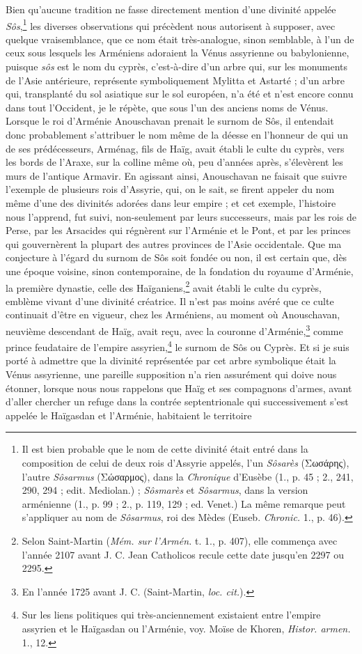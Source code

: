 \documentclass{article}
\begin{document}
Bien qu'aucune tradition ne fasse directement mention d'une divinité appelée \emph{Sôs},\footnote{Il est bien probable que le nom de cette divinité était entré dans la composition de celui de deux rois d'Assyrie appelés, l'un \emph{Sôsarès} (\textgreek{Σωσάρης}), l'autre \emph{Sôsarmus} (\textgreek{Σώσαρμος}), dans la \emph{Chronique} d'Eusèbe (1., p. 45 ; 2., 241, 290, 294 ; edit. Mediolan.) ; \emph{Sôsmarès} et \emph{Sôsarmus}, dans la version arménienne (1., p. 99 ; 2., p. 119, 129 ; ed. Venet.) La même remarque peut s'appliquer au nom de \emph{Sôsarmus}, roi des Mèdes (Euseb. \emph{Chronic.} 1., p. 46).} les diverses observations qui précèdent nous autorisent à supposer, avec quelque vraisemblance, que ce nom était très-analogue, sinon semblable, à l'un de ceux sous lesquels les Arméniens adoraient la Vénus assyrienne ou babylonienne, puisque \emph{sôs} est le nom du cyprès, c'est-à-dire d'un arbre qui, sur les monuments de l'Asie antérieure, représente symboliquement Mylitta et Astarté ; d'un arbre qui, transplanté du sol asiatique sur le sol européen, n'a été et n'est encore connu dans tout l'Occident, je le répète, que sous l'un des anciens noms de Vénus. Lorsque le roi d'Arménie Anouschavan prenait le surnom de Sôs, il entendait donc probablement s'attribuer le nom même de la déesse en l'honneur de qui un de ses prédécesseurs, Arménag, fils de Haïg, avait établi le culte du cyprès, vers les bords de l'Araxe, sur la colline même où, peu d'années après, s'élevèrent les murs de l'antique Armavir. En agissant ainsi, Anouschavan ne faisait que suivre l'exemple de plusieurs rois d'Assyrie, qui, on le sait, se firent appeler du nom même d'une des divinités adorées dans leur empire ; et cet exemple, l'histoire nous l'apprend, fut suivi, non-seulement par leurs successeurs, mais par les rois de Perse, par les Arsacides qui régnèrent sur l'Arménie et le Pont, et par les princes qui gouvernèrent la plupart des autres provinces de l'Asie occidentale. Que ma conjecture à l'égard du surnom de Sôs soit fondée ou non, il est certain que, dès une époque voisine, sinon contemporaine, de la fondation du royaume d'Arménie, la première dynastie, celle des Haïganiens,\footnote{Selon Saint-Martin (\emph{Mém. sur l'Armén.} t. 1., p. 407), elle commença avec l'année 2107 avant J. C. Jean Catholicos recule cette date jusqu'en 2297 ou 2295.} avait établi le culte du cyprès, emblème vivant d'une divinité créatrice. Il n'est pas moins avéré que ce culte continuait d'être en vigueur, chez les Arméniens, au moment où Anouschavan, neuvième descendant de Haïg, avait reçu, avec la couronne d'Arménie,\footnote{En l'année 1725 avant J. C. (Saint-Martin, \emph{loc. cit.}).} comme prince feudataire de l'empire assyrien,\footnote{Sur les liens politiques qui très-anciennement existaient entre l'empire assyrien et le Haïgasdan ou l'Arménie, voy. Moïse de Khoren, \emph{Histor. armen.} 1., 12.} le surnom de Sôs ou Cyprès. Et si je suis porté à admettre que la divinité représentée par cet arbre symbolique était la Vénus assyrienne, une pareille supposition n'a rien assurément qui doive nous étonner, lorsque nous nous rappelons que Haïg et ses compagnons d'armes, avant d'aller chercher un refuge dans la contrée septentrionale qui successivement s'est appelée le Haïgasdan et l'Arménie, habitaient le territoire 
\end{document}
